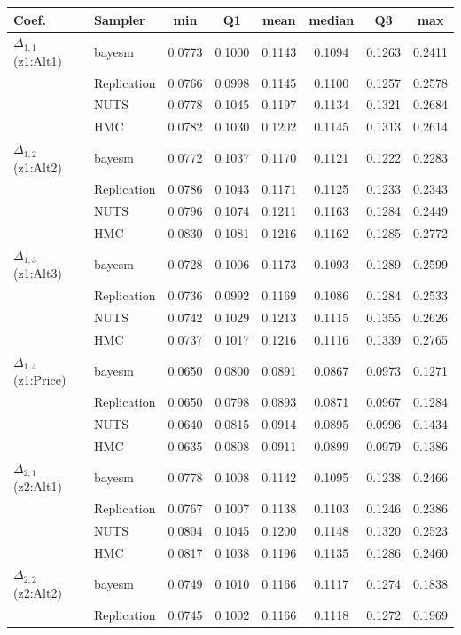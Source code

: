 \begin{tabular}{llcccccc}
\toprule
Coef. & Sampler & min & Q1 & mean & median & Q3 & max \\
\midrule
$\Delta_{1,1}$ (z1:Alt1) & bayesm & 0.0773 & 0.1000 & 0.1143 & 0.1094 & 0.1263 & 0.2411 \\
 & Replication & 0.0766 & 0.0998 & 0.1145 & 0.1100 & 0.1257 & 0.2578 \\
 & NUTS & 0.0778 & 0.1045 & 0.1197 & 0.1134 & 0.1321 & 0.2684 \\
 & HMC & 0.0782 & 0.1030 & 0.1202 & 0.1145 & 0.1313 & 0.2614 \\
$\Delta_{1,2}$ (z1:Alt2) & bayesm & 0.0772 & 0.1037 & 0.1170 & 0.1121 & 0.1222 & 0.2283 \\
 & Replication & 0.0786 & 0.1043 & 0.1171 & 0.1125 & 0.1233 & 0.2343 \\
 & NUTS & 0.0796 & 0.1074 & 0.1211 & 0.1163 & 0.1284 & 0.2449 \\
 & HMC & 0.0830 & 0.1081 & 0.1216 & 0.1162 & 0.1285 & 0.2772 \\
$\Delta_{1,3}$ (z1:Alt3) & bayesm & 0.0728 & 0.1006 & 0.1173 & 0.1093 & 0.1289 & 0.2599 \\
 & Replication & 0.0736 & 0.0992 & 0.1169 & 0.1086 & 0.1284 & 0.2533 \\
 & NUTS & 0.0742 & 0.1029 & 0.1213 & 0.1115 & 0.1355 & 0.2626 \\
 & HMC & 0.0737 & 0.1017 & 0.1216 & 0.1116 & 0.1339 & 0.2765 \\
$\Delta_{1,4}$ (z1:Price) & bayesm & 0.0650 & 0.0800 & 0.0891 & 0.0867 & 0.0973 & 0.1271 \\
 & Replication & 0.0650 & 0.0798 & 0.0893 & 0.0871 & 0.0967 & 0.1284 \\
 & NUTS & 0.0640 & 0.0815 & 0.0914 & 0.0895 & 0.0996 & 0.1434 \\
 & HMC & 0.0635 & 0.0808 & 0.0911 & 0.0899 & 0.0979 & 0.1386 \\
$\Delta_{2,1}$ (z2:Alt1) & bayesm & 0.0778 & 0.1008 & 0.1142 & 0.1095 & 0.1238 & 0.2466 \\
 & Replication & 0.0767 & 0.1007 & 0.1138 & 0.1103 & 0.1246 & 0.2386 \\
 & NUTS & 0.0804 & 0.1045 & 0.1200 & 0.1148 & 0.1320 & 0.2523 \\
 & HMC & 0.0817 & 0.1038 & 0.1196 & 0.1135 & 0.1286 & 0.2460 \\
$\Delta_{2,2}$ (z2:Alt2) & bayesm & 0.0749 & 0.1010 & 0.1166 & 0.1117 & 0.1274 & 0.1838 \\
 & Replication & 0.0745 & 0.1002 & 0.1166 & 0.1118 & 0.1272 & 0.1969 \\

\end{tabular}
